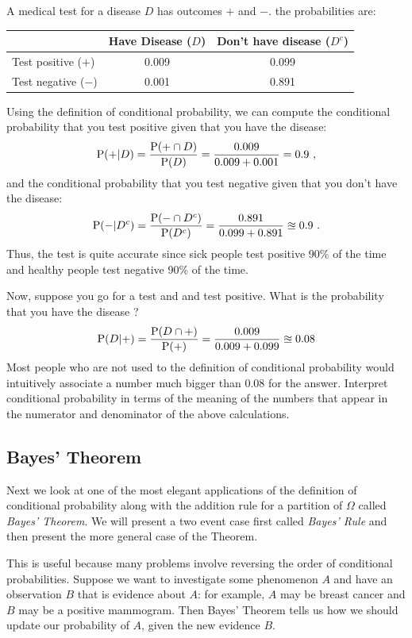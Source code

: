 
\begin{example}[Wasserman03, p.~11]\label{EX:Wasserman03p11}
 A medical test for a disease $D$ has outcomes $+$ and $-$.  the probabilities are:
\begin{center}
 \begin{tabular}{l | c | c}
 \hline
 & Have Disease ($D$) & Don't have disease ($D^c$)  \\ \hline
Test positive ($+$) & 0.009 & 0.099 \\
 Test negative ($-$) & 0.001 & 0.891\\ \hline
 \end{tabular}
 \end{center}
 Using the definition of conditional probability, we can compute the conditional probability that you test positive given that you have the disease:
 \[
 \P(+ | D) = \frac{\P(+ \cap D)}{\P(D)} = \frac{0.009}{0.009+0.001}=0.9 \ ,
 \]
 and the conditional probability that you test negative given that you don't have the disease:
 \[
 \P(- | D^c) = \frac{\P(- \cap D^c)}{\P(D^c)} = \frac{0.891}{0.099+0.891} \approxeq 0.9 \ .
 \]
 Thus, the test is quite accurate since sick people test positive 90\% of the time and healthy people test negative 90\% of the time.
 
Now, suppose you go for a test and and test positive.  What is the probability that you have the disease ?
 \[
 \P(D|+) = \frac{\P(D \cap +)}{\P(+)} = \frac{0.009}{0.009+0.099} \approxeq 0.08
 \]
Most people who are not used to the definition of conditional probability would intuitively associate a number much bigger than $0.08$ for the answer.  Interpret conditional probability in terms of the meaning of the numbers that appear in the numerator and denominator of the above calculations.
\end{example}
 
\subsection{Bayes' Theorem}\label{S:BayesTheorem}
 Next we look at one of the most elegant applications of the definition of conditional probability along with the addition rule for a partition of $\Omega$ called \emph{Bayes' Theorem}. 
We will present a two event case first called \emph{Bayes' Rule} and then present the more general case of the Theorem.

This is useful because many problems involve reversing the order of conditional
probabilities. Suppose we want to investigate  some phenomenon $A$  and
have an observation $B$ that is evidence about $A$: for example, $A$ may
be breast cancer and $B$  may be a positive mammogram. Then  Bayes'
Theorem tells us how we should update our probability of $A$, given the
new evidence $B$.

